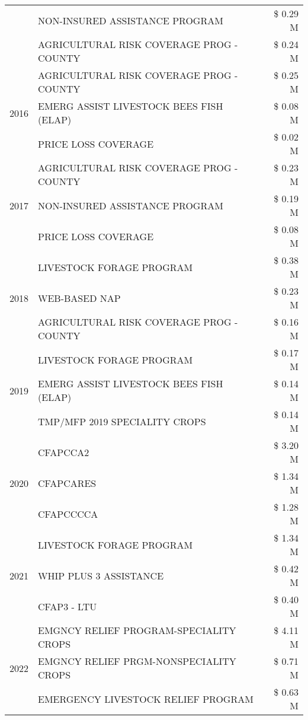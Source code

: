 \begin{tabular}{llr}
 & NON-INSURED ASSISTANCE PROGRAM & \$ 0.29 M \\
 & AGRICULTURAL RISK COVERAGE PROG - COUNTY & \$ 0.24 M \\
\cline{1-3}
\multirow[t]{3}{*}{2016} & AGRICULTURAL RISK COVERAGE PROG - COUNTY & \$ 0.25 M \\
 & EMERG ASSIST LIVESTOCK BEES FISH (ELAP) & \$ 0.08 M \\
 & PRICE LOSS COVERAGE & \$ 0.02 M \\
\cline{1-3}
\multirow[t]{3}{*}{2017} & AGRICULTURAL RISK COVERAGE PROG - COUNTY & \$ 0.23 M \\
 & NON-INSURED ASSISTANCE PROGRAM & \$ 0.19 M \\
 & PRICE LOSS COVERAGE & \$ 0.08 M \\
\cline{1-3}
\multirow[t]{3}{*}{2018} & LIVESTOCK FORAGE PROGRAM & \$ 0.38 M \\
 & WEB-BASED NAP & \$ 0.23 M \\
 & AGRICULTURAL RISK COVERAGE PROG - COUNTY & \$ 0.16 M \\
\cline{1-3}
\multirow[t]{3}{*}{2019} & LIVESTOCK FORAGE PROGRAM & \$ 0.17 M \\
 & EMERG ASSIST LIVESTOCK BEES FISH (ELAP) & \$ 0.14 M \\
 & TMP/MFP 2019 SPECIALITY CROPS & \$ 0.14 M \\
\cline{1-3}
\multirow[t]{3}{*}{2020} & CFAPCCA2 & \$ 3.20 M \\
 & CFAPCARES & \$ 1.34 M \\
 & CFAPCCCCA & \$ 1.28 M \\
\cline{1-3}
\multirow[t]{3}{*}{2021} & LIVESTOCK FORAGE PROGRAM & \$ 1.34 M \\
 & WHIP PLUS 3 ASSISTANCE & \$ 0.42 M \\
 & CFAP3 - LTU & \$ 0.40 M \\
\cline{1-3}
\multirow[t]{3}{*}{2022} & EMGNCY RELIEF PROGRAM-SPECIALITY CROPS & \$ 4.11 M \\
 & EMGNCY RELIEF PRGM-NONSPECIALITY CROPS & \$ 0.71 M \\
 & EMERGENCY LIVESTOCK RELIEF PROGRAM & \$ 0.63 M \\
\cline{1-3}
\bottomrule
\end{tabular}
